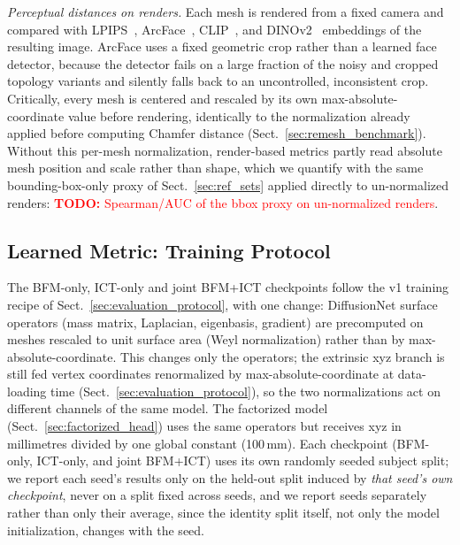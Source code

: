 \documentclass[10pt,twocolumn,letterpaper]{article}
\newcommand{\todo}[1]{\textcolor{red}{\textbf{TODO:} #1}}
\begin{document}
\emph{Perceptual distances on renders.} Each mesh is rendered from a fixed camera and compared with LPIPS~\cite{lpips}, ArcFace~\cite{deng2019arcface}, CLIP~\cite{radford2021clip}, and DINOv2~\cite{oquab2023dinov2} embeddings of the resulting image. ArcFace uses a fixed geometric crop rather than a learned face detector, because the detector fails on a large fraction of the noisy and cropped topology variants and silently falls back to an uncontrolled, inconsistent crop. Critically, every mesh is centered and rescaled by its own max-absolute-coordinate value before rendering, identically to the normalization already applied before computing Chamfer distance (Sect.~\ref{sec:remesh_benchmark}). Without this per-mesh normalization, render-based metrics partly read absolute mesh position and scale rather than shape, which we quantify with the same bounding-box-only proxy of Sect.~\ref{sec:ref_sets} applied directly to un-normalized renders: \todo{Spearman/AUC of the bbox proxy on un-normalized renders}.

\subsection{Learned Metric: Training Protocol}
\label{sec:learned_metric_protocol}
The BFM-only, ICT-only and joint BFM+ICT checkpoints follow the v1 training recipe of Sect.~\ref{sec:evaluation_protocol}, with one change: DiffusionNet surface operators (mass matrix, Laplacian, eigenbasis, gradient) are precomputed on meshes rescaled to unit surface area (Weyl normalization) rather than by max-absolute-coordinate. This changes only the operators; the extrinsic xyz branch is still fed vertex coordinates renormalized by max-absolute-coordinate at data-loading time (Sect.~\ref{sec:evaluation_protocol}), so the two normalizations act on different channels of the same model. The factorized model (Sect.~\ref{sec:factorized_head}) uses the same operators but receives xyz in millimetres divided by one global constant (100\,mm). Each checkpoint (BFM-only, ICT-only, and joint BFM+ICT) uses its own randomly seeded subject split; we report each seed's results only on the held-out split induced by \emph{that seed's own checkpoint}, never on a split fixed across seeds, and we report seeds separately rather than only their average, since the identity split itself, not only the model initialization, changes with the seed.
\end{document}
